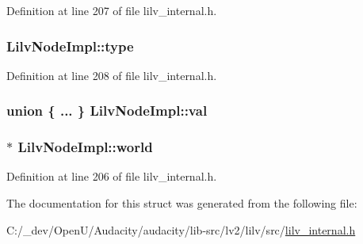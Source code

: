 Definition at line 207 of file lilv\+\_\+internal.\+h.

\subsubsection[{\texorpdfstring{type}{type}}]{ Lilv\+Node\+Impl\+::type}\hypertarget{struct_lilv_node_impl_a0aa1bfe76dbd81a2ede605dbb93b0dc1}{}\label{struct_lilv_node_impl_a0aa1bfe76dbd81a2ede605dbb93b0dc1}


Definition at line 208 of file lilv\+\_\+internal.\+h.

\subsubsection[{\texorpdfstring{val}{val}}]{\setlength{\rightskip}{0pt plus 5cm}union \{ ... \}   Lilv\+Node\+Impl\+::val}\hypertarget{struct_lilv_node_impl_a41960922e4be49a41b54aa7655e679e2}{}\label{struct_lilv_node_impl_a41960922e4be49a41b54aa7655e679e2}
\subsubsection[{\texorpdfstring{world}{world}}]{$\ast$ Lilv\+Node\+Impl\+::world}\hypertarget{struct_lilv_node_impl_ad5dad43f2a5a7fd3f20f4474db93508c}{}\label{struct_lilv_node_impl_ad5dad43f2a5a7fd3f20f4474db93508c}


Definition at line 206 of file lilv\+\_\+internal.\+h.



The documentation for this struct was generated from the following file\+:\begin{DoxyCompactItemize}
\item 
C\+:/\+\_\+dev/\+Open\+U/\+Audacity/audacity/lib-\/src/lv2/lilv/src/\hyperlink{lilv__internal_8h}{lilv\+\_\+internal.\+h}\end{DoxyCompactItemize}
